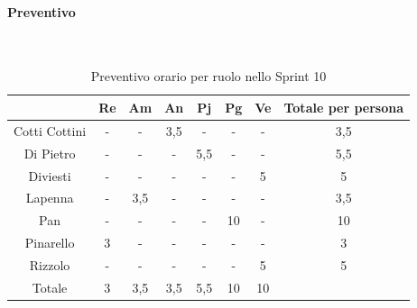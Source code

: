 \documentclass{article}
\begin{document}
                \paragraph{Preventivo}\mbox{}\\
                \begin{table}[H]
                    \centering
                    \begin{tabular}{|c|c|c|c|c|c|c|c|}
                    \hline
                                  & Re  & Am  & An  & Pj  & Pg  & Ve  & Totale per persona \\ \hline
                    Cotti Cottini & -   & -   & 3,5 & -   & -   & -   & 3,5               \\ \hline
                    Di Pietro     & -   & -   & -   & 5,5 & -   & -   & 5,5                 \\ \hline
                    Diviesti      & -   & -   & -   & -   & -   & 5   & 5               \\ \hline
                    Lapenna       & -   & 3,5 & -   & -   & -   & -   & 3,5                 \\ \hline
                    Pan           & -   & -   & -   & -   & 10  & -   & 10                \\ \hline
                    Pinarello     & 3   & -   & -   & -   & -   & -   & 3                 \\ \hline
                    Rizzolo       & -   & -   & -   & -   & -   & 5   & 5                 \\ \hline
                    Totale        & 3   & 3,5 & 3,5 & 5,5 & 10  & 10  &                 \\ \hline
                    \end{tabular}
                    \caption{Preventivo orario per ruolo nello Sprint 10}
                \end{table}

\end{document}
